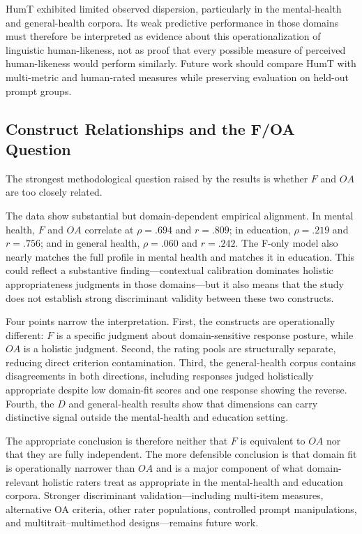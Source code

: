\documentclass[manuscript,review,anonymous]{acmart}
\begin{document}
HumT exhibited limited observed dispersion, particularly in the mental-health and general-health corpora. Its weak predictive performance in those domains must therefore be interpreted as evidence about this operationalization of linguistic human-likeness, not as proof that every possible measure of perceived human-likeness would perform similarly. Future work should compare HumT with multi-metric and human-rated measures while preserving evaluation on held-out prompt groups.

\subsection{Construct Relationships and the F/OA Question}

The strongest methodological question raised by the results is whether $F$ and $OA$ are too closely related.

The data show substantial but domain-dependent empirical alignment. In mental health, $F$ and $OA$ correlate at $\rho=.694$ and $r=.809$; in education, $\rho=.219$ and $r=.756$; and in general health, $\rho=.060$ and $r=.242$. The F-only model also nearly matches the full profile in mental health and matches it in education. This could reflect a substantive finding---contextual calibration dominates holistic appropriateness judgments in those domains---but it also means that the study does not establish strong discriminant validity between these two constructs.

Four points narrow the interpretation. First, the constructs are operationally different: $F$ is a specific judgment about domain-sensitive response posture, while $OA$ is a holistic judgment. Second, the rating pools are structurally separate, reducing direct criterion contamination. Third, the general-health corpus contains disagreements in both directions, including responses judged holistically appropriate despite low domain-fit scores and one response showing the reverse. Fourth, the $D$ and general-health results show that dimensions can carry distinctive signal outside the mental-health and education setting.

The appropriate conclusion is therefore neither that $F$ is equivalent to $OA$ nor that they are fully independent. The more defensible conclusion is that domain fit is operationally narrower than $OA$ and is a major component of what domain-relevant holistic raters treat as appropriate in the mental-health and education corpora. Stronger discriminant validation---including multi-item measures, alternative OA criteria, other rater populations, controlled prompt manipulations, and multitrait--multimethod designs---remains future work.
\end{document}
